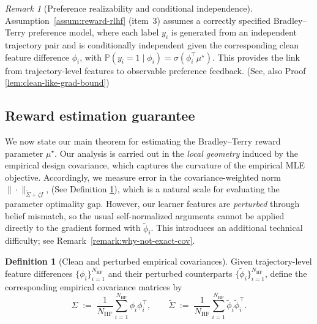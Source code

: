 \documentclass[10pt]{article} %
\theoremstyle{plain}
\theoremstyle{definition}
\newtheorem{definition}[theorem]{Definition}
\theoremstyle{remark}
\newtheorem{remark}[theorem]{Remark}
\newcommand{\bP}{\mathbb{P}}
\begin{document}
\begin{remark}[Preference realizability and conditional independence]\label{remark:label-cond-indep}
Assumption~\ref{assum:reward-rlhf} (item~3) assumes a correctly specified Bradley--Terry preference model, where each label $y_i$ is generated from an independent trajectory pair and is conditionally independent given the corresponding clean feature difference $\phi_i$, with \(
\bP(y_i=1\mid \phi_i)=\sigma(\phi_i^\top\mu^\star).
\) This provides the link from trajectory-level features to observable preference feedback. (See, also Proof \ref{lem:clean-like-grad-bound})
\end{remark}


 \subsection{Reward estimation guarantee}\label{subsec:main-reward-thm}

 
We now state our main theorem for estimating the Bradley--Terry reward parameter
$\mu^\star$. Our analysis is carried out in the \emph{local geometry} induced by the
empirical design covariance, which captures the curvature of the empirical MLE objective. Accordingly, we measure error in the
covariance-weighted norm $\|\cdot\|_{\tilde\Sigma+\zeta I}$, (See Definition \ref{def:clean-pert-cov}), which is a natural
scale for evaluating the parameter optimality gap. However, our learner features are
\emph{perturbed} through belief mismatch, so the usual self-normalized arguments \cite{ZhuPrincipledComparisons, NIPS2011_e1d5be1c} cannot be applied directly to the gradient formed with $\tilde\phi_i$.
This introduces an additional technical difficulty; see Remark~\ref{remark:why-not-exact-cov}.

\begin{definition}[Clean and perturbed empirical covariances]\label{def:clean-pert-cov}
Given trajectory-level feature differences $\{\phi_i\}_{i=1}^{N_{\mathrm{HF}}}$ and their perturbed counterparts
$\{\tilde\phi_i\}_{i=1}^{N_{\mathrm{HF}}}$, define the corresponding empirical covariance matrices by
\begin{equation}\label{eq:sigma-cov-hf}
\Sigma \;:=\; \frac{1}{N_{\mathrm{HF}}}\sum_{i=1}^{N_{\mathrm{HF}}}\phi_i\phi_i^\top,
\qquad
\tilde\Sigma \;:=\; \frac{1}{N_{\mathrm{HF}}}\sum_{i=1}^{N_{\mathrm{HF}}}\tilde\phi_i\tilde\phi_i^\top.
\end{equation}
\end{definition}
\end{document}
